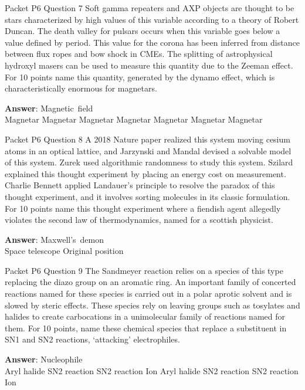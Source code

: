 \begin{frame}{Packet P6 Question 7}
Soft gamma repeaters and     AXP objects are thought   to be stars characterized by high values of this variable according to a theory of Robert Duncan. The death valley for pulsars occurs when this variable goes below a value defined by period. This value for the corona has been inferred from distance between flux ropes and bow shock in CMEs. The splitting of astrophysical hydroxyl masers can be used to measure this quantity due to the Zeeman effect. For 10 points name this quantity, generated by the dynamo effect, which is characteristically enormous for magnetars.        

\textbf{Answer}: Magnetic\ field\\
 Magnetar
 Magnetar
 Magnetar
 Magnetar
 Magnetar
 Magnetar
 Magnetar
\end{frame}

\begin{frame}{Packet P6 Question 8}
A 2018 Nature paper realized   this system moving cesium atoms in an optical lattice, and Jarzynski and Mandal devised a solvable model of this system. Zurek used algorithmic randomness to study this system. Szilard explained this thought experiment   by placing an energy cost on measurement. Charlie Bennett applied Landauer’s principle to resolve   the paradox of this thought experiment, and it involves sorting molecules in its classic formulation. For 10 points name this thought experiment   where a fiendish agent allegedly violates the second law of thermodynamics,     named for a scottish physicist.

\textbf{Answer}: Maxwell's\ demon\\
 Space telescope
 Original position
\end{frame}

\begin{frame}{Packet P6 Question 9}
The Sandmeyer reaction relies on a species of this type replacing the diazo group on an aromatic ring. An important family of concerted reactions named for these   species is carried out in a polar aprotic solvent and is slowed by steric effects.   These species rely on leaving groups such as tosylates and halides to create   carbocations in a unimolecular family of reactions named for them. For 10 points, name these chemical species that replace   a substituent in SN1 and SN2 reactions, ‘attacking’ electrophiles.        

\textbf{Answer}: Nucleophile\\
 Aryl halide
 SN2 reaction
 SN2 reaction
 Ion
 Aryl halide
 SN2 reaction
 SN2 reaction
 Ion
\end{frame}


